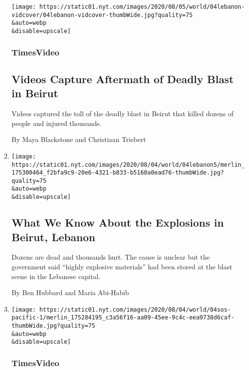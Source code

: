 \begin{enumerate}
  \texttt{[image: https://static01.nyt.com/images/2020/08/05/world/04lebanon-vidcover/04lebanon-vidcover-thumbWide.jpg?quality=75\\\&auto=webp\\\&disable=upscale]}

  \hypertarget{timesvideo}{%
  \subsubsection{TimesVideo}\label{timesvideo}}

  \hypertarget{videos-capture-aftermath-of-deadly-blast-in-beirut}{%
  \subsection{Videos Capture Aftermath of Deadly Blast in
  Beirut}\label{videos-capture-aftermath-of-deadly-blast-in-beirut}}

  Videos captured the toll of the deadly blast in Beirut that killed
  dozens of people and injured thousands.

  By Maya Blackstone and Christiaan Triebert
\item
  \href{/2020/08/04/world/middleeast/beirut-explosion-blast.html}{}

  \texttt{[image: https://static01.nyt.com/images/2020/08/04/world/04lebanon5/merlin\_175300464\_f2bfa9c9-20e6-4321-b833-b5160a0ead76-thumbWide.jpg?quality=75\\\&auto=webp\\\&disable=upscale]}

  \hypertarget{what-we-know-about-the-explosions-in-beirut-lebanon}{%
  \subsection{What We Know About the Explosions in Beirut,
  Lebanon}\label{what-we-know-about-the-explosions-in-beirut-lebanon}}

  Dozens are dead and thousands hurt. The cause is unclear but the
  government said ``highly explosive materials'' had been stored at the
  blast scene in the Lebanese capital.

  By Ben Hubbard and Maria Abi-Habib
\item
  \href{/video/world/100000007271927/pacific-island-rescue-video.html}{}

  \texttt{[image: https://static01.nyt.com/images/2020/08/04/world/04sos-pacific-1/merlin\_175284195\_c3a56f16-aa09-45ee-9c4c-eea9738d6caf-thumbWide.jpg?quality=75\\\&auto=webp\\\&disable=upscale]}

  \hypertarget{timesvideo-1}{%
  \subsubsection{TimesVideo}\label{timesvideo-1}}


\end{enumerate}

